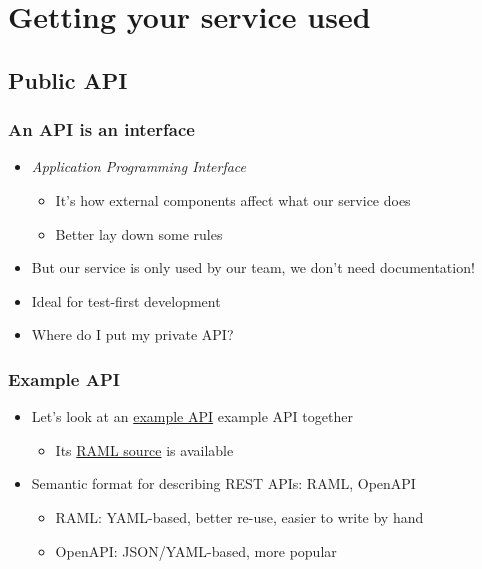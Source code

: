 \documentclass[8pt]{article}
\begin{document}
\section{Getting your service used}
\label{sec:org77606af}
\subsection{Public API}
\label{sec:orgc10bb0e}
\subsubsection{An API is an interface}
\label{sec:org162f5cb}
\begin{itemize}
\item \emph{Application Programming Interface}
\begin{itemize}
\item It's how external components affect what our service does
\item Better lay down some rules
\end{itemize}
\item But our service is only used by our team, we don't need documentation!
\item Ideal for test-first development
\item Where do I put my private API?
\end{itemize}
\subsubsection{Example API}
\label{sec:orgbb53c41}
\begin{itemize}
\item Let's look at an \href{demo-project/documentation/demo-api.html}{example API} example API together
\begin{itemize}
\item Its \href{demo-project/documentation/demo-api.raml}{RAML source} is available
\end{itemize}
\item Semantic format for describing REST APIs: RAML, OpenAPI
\begin{itemize}
\item RAML: YAML-based, better re-use, easier to write by hand
\item OpenAPI: JSON/YAML-based, more popular
\end{itemize}
\end{itemize}
\end{document}
